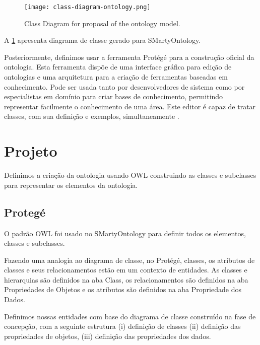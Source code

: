 \begin{figure}[htb]
	\centering
	\texttt{[image: class-diagram-ontology.png]}
	\caption{Class Diagram for proposal of the ontology model.}
	\label{figure:class_diagram_ontology}
\end{figure}

A \ref{figure:class_diagram_ontology} apresenta  diagrama de classe gerado para SMartyOntology.

Posteriormente, definimos usar a ferramenta Protégé para a construção oficial da ontologia. Esta ferramenta dispõe de uma interface gráfica para edição de ontologias e uma arquitetura para a criação de ferramentas baseadas em conhecimento. Pode ser usada tanto por desenvolvedores de sistema como por especialistas em domínio para criar bases de conhecimento, permitindo representar facilmente o conhecimento de uma área. Este editor é capaz de tratar classes, com sua definição e exemplos, simultaneamente \cite{DBLP:journals/aimatters/Musen15}.


\section{Projeto}
\label{sec:projeto}

Definimos a criação da ontologia usando OWL construindo as classes e subclasses para representar os elementos da ontologia.

\subsection{Protegé}
\label{sec:protege}

O padrão OWL foi usado no SMartyOntology para definir todos os elementos, classes e subclasses.

Fazendo uma analogia ao diagrama de classe, no Protégé, classes, os atributos de classes e seus relacionamentos estão em um contexto de entidades. As classes e hierarquias são definidos na aba Class, os relacionamentos são definidos na aba Propriedades de Objetos e os atributos são definidos na aba Propriedade dos Dados.

Definimos nossas entidades com base do diagrama de classe construído na fase de concepção, com a seguinte estrutura (i) definição de classes (ii) definição das propriedades de objetos, (iii) definição das propriedades dos dados.

